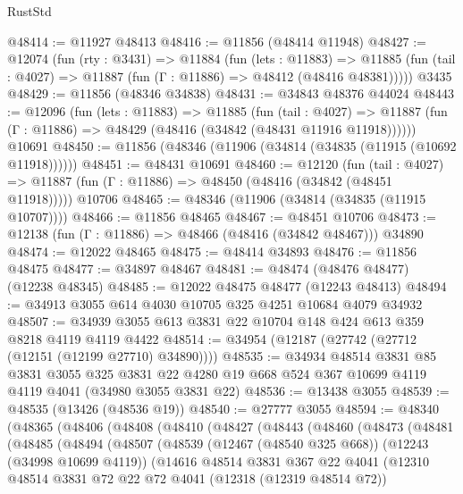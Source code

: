 \begin{lexlean}{RustStd}
\begin{coremodule}
@48414 := @11927 @48413
@48416 := @11856 (@48414 @11948)
@48427 := @12074
    (fun (rty : @3431) =>
    @11884
      (fun (lets : @11883) =>
      @11885 (fun (tail : @4027) => @11887 (fun (Γ : @11886) => @48412 (@48416 @48381)))))
    @3435
@48429 := @11856 (@48346 @34838)
@48431 := @34843 @48376 @44024
@48443 := @12096
    (fun (lets : @11883) =>
    @11885
      (fun (tail : @4027) =>
      @11887 (fun (Γ : @11886) => @48429 (@48416 (@34842 (@48431 @11916 @11918))))))
    @10691
@48450 := @11856 (@48346 (@11906 (@34814 (@34835 (@11915 (@10692 @11918))))))
@48451 := @48431 @10691
@48460 := @12120
    (fun (tail : @4027) => @11887 (fun (Γ : @11886) => @48450 (@48416 (@34842 (@48451 @11918)))))
    @10706
@48465 := @48346 (@11906 (@34814 (@34835 (@11915 @10707))))
@48466 := @11856 @48465
@48467 := @48451 @10706
@48473 := @12138 (fun (Γ : @11886) => @48466 (@48416 (@34842 @48467))) @34890
@48474 := @12022 @48465
@48475 := @48414 @34893
@48476 := @11856 @48475
@48477 := @34897 @48467
@48481 := @48474 (@48476 @48477) (@12238 @48345)
@48485 := @12022 @48475 @48477 (@12243 @48413)
@48494 := @34913 @3055 @614 @4030 @10705 @325 @4251 @10684 @4079 @34932
@48507 := @34939 @3055 @613 @3831 @22 @10704 @148 @424 @613 @359 @8218 @4119 @4119 @4422
@48514 := @34954 (@12187 (@27742 (@27712 (@12151 (@12199 @27710) @34890))))
@48535 := @34934
    @48514
    @3831
    @85
    @3831
    @3055
    @325
    @3831
    @22
    @4280
    @19
    @668
    @524
    @367
    @10699
    @4119
    @4119
    @4041
    (@34980 @3055 @3831 @22)
@48536 := @13438 @3055
@48539 := @48535 (@13426 (@48536 @19))
@48540 := @27777 @3055
@48594 := @48340
    (@48365
      (@48406
        (@48408
          (@48410
            (@48427
              (@48443
                (@48460
                  (@48473
                    (@48481
                      (@48485
                        (@48494
                          (@48507
                            (@48539
                              (@12467 (@48540 @325 @668))
                              (@12243 (@34998 @10699 @4119))
                              (@14616
                                @48514
                                @3831
                                @367
                                @22
                                @4041
                                (@12310
                                  @48514
                                  @3831
                                  @72
                                  @22
                                  @72
                                  @4041
                                  (@12318 (@12319 @48514 @72))

\end{coremodule}
\end{lexlean}
